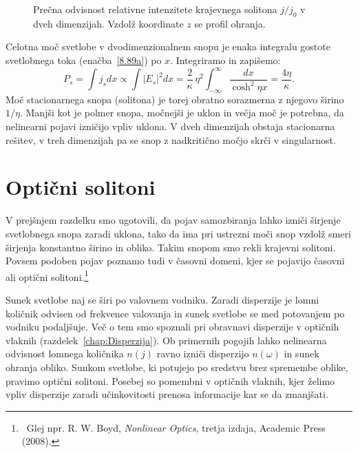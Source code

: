 \begin{figure}[ht]
\centering
\def\svgwidth{105truemm} 

\caption{Prečna odvisnost relativne intenzitete krajevnega solitona $j/j_0$ v dveh dimenzijah. 
Vzdolž koordinate $z$ se profil ohranja.}
\label{fig:soliton}
\end{figure}
Celotna moč svetlobe v dvodimenzionalnem snopu je enaka integralu
gostote svetlobnega toka (enačba~\ref{8.89a}) po $x$. Integriramo in zapišemo:
\begin{equation}
P_s = \int j_s dx \propto \int |E_s|^2 dx  = 
\frac{2}{\kappa}\,\eta^{2}\int_{-\infty}^{\infty}\frac{dx}
{\cosh^{2}\eta x}=\frac{4\eta}{\kappa}.
\label{eq:solj}
\end{equation}
Moč stacionarnega snopa (solitona) je torej obratno sorazmerna 
z njegovo širino $1/\eta$. Manjši kot je polmer snopa, močnejši je uklon
in večja moč je potrebna, da nelinearni pojavi izničijo vpliv uklona. 
V dveh dimenzijah obstaja stacionarna rešitev, v treh dimenzijah pa 
se snop z nadkritično močjo skrči v singularnost.

\section{Optični solitoni}
\label{chap:soliton}
V prejšnjem razdelku smo ugotovili, da pojav samozbiranja lahko izniči širjenje 
svetlobnega snopa zaradi uklona, tako da ima pri
ustrezni moči snop vzdolž smeri širjenja konstantno širino in obliko. Takim snopom 
smo rekli krajevni solitoni. Povsem podoben pojav poznamo tudi v časovni 
domeni, kjer se pojavijo časovni ali optični solitoni.\footnote{~Glej npr. R. W. 
Boyd, {\it Nonlinear Optics}, tretja izdaja, Academic Press (2008).}

Sunek svetlobe  naj se širi po valovnem vodniku. Zaradi disperzije je lomni količnik
odvisen od frekvence valovanja in sunek svetlobe se med potovanjem po vodniku podaljšuje. 
Več o tem smo spoznali pri 
obravnavi disperzije v optičnih vlaknih (razdelek~\ref{chap:Disperzija}). 
Ob primernih pogojih lahko nelinearna odvisnost lomnega količnika $n(j)$ 
ravno izniči disperzijo $n(\omega)$ in sunek
ohranja obliko. Sunkom svetlobe, ki potujejo po sredstvu brez spremembe
oblike, pravimo optični solitoni. Posebej so pomembni v optičnih vlaknih, 
kjer želimo  vpliv disperzije zaradi učinkovitosti prenosa
informacije kar se da zmanjšati. 

